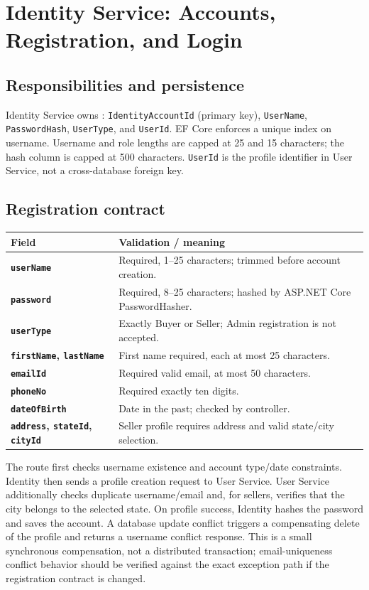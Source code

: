\documentclass[10pt,a4paper]{article}
\newcommand{\code}[1]{\texttt{\detokenize{#1}}}
\newcommand{\field}[1]{\texttt{#1}}
\newcommand{\pagebreakdoc}{\clearpage}
\begin{document}
\pagebreakdoc
\section{Identity Service: Accounts, Registration, and Login}
\subsection{Responsibilities and persistence}
Identity Service owns \code{IdentityAccount}: \field{IdentityAccountId} (primary key),
\field{UserName}, \field{PasswordHash}, \field{UserType}, and \field{UserId}. EF Core
enforces a unique index on username. Username and role lengths are capped at 25 and
15 characters; the hash column is capped at 500 characters. \field{UserId} is the
profile identifier in User Service, not a cross-database foreign key.

\subsection{Registration contract}
\begin{tabularx}{\textwidth}{>{\bfseries}p{36mm} X}
\toprule
Field & Validation / meaning\\
\midrule
\field{userName} & Required, 1--25 characters; trimmed before account creation.\\
\field{password} & Required, 8--25 characters; hashed by ASP.NET Core PasswordHasher.\\
\field{userType} & Exactly Buyer or Seller; Admin registration is not accepted.\\
\field{firstName}, \field{lastName} & First name required, each at most 25 characters.\\
\field{emailId} & Required valid email, at most 50 characters.\\
\field{phoneNo} & Required exactly ten digits.\\
\field{dateOfBirth} & Date in the past; checked by controller.\\
\field{address}, \field{stateId}, \field{cityId} & Seller profile requires address and valid state/city selection.\\
\bottomrule
\end{tabularx}
The route first checks username existence and account type/date constraints. Identity
then sends a profile creation request to User Service. User Service additionally
checks duplicate username/email and, for sellers, verifies that the city belongs to
the selected state. On profile success, Identity hashes the password and saves the
account. A database update conflict triggers a compensating delete of the profile
and returns a username conflict response. This is a small synchronous compensation,
not a distributed transaction; email-uniqueness conflict behavior should be verified
against the exact exception path if the registration contract is changed.
\end{document}
